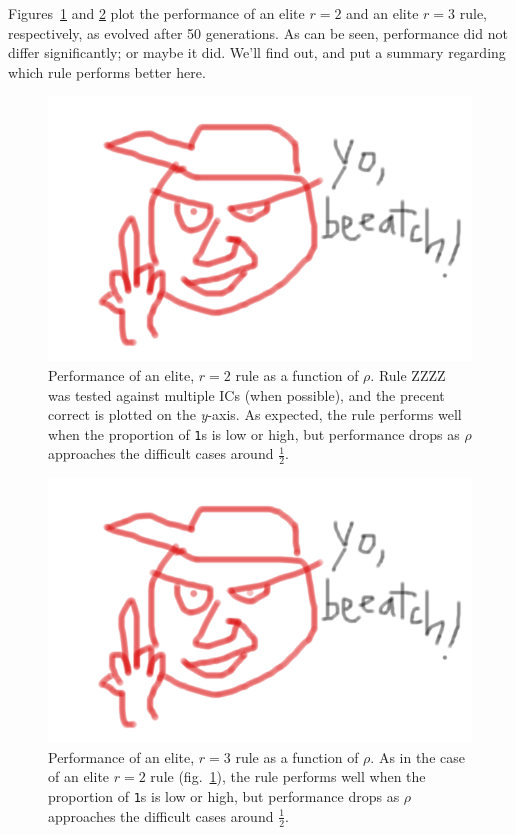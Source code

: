 Figures~\ref{fig:r2_rho} and \ref{fig:r3_rho} plot the performance of an elite $r = 2$ and an elite $r = 3$ rule, respectively, as evolved after 50 generations. As can be seen, performance did not differ significantly; or maybe it did. We'll find out, and put a summary regarding which rule performs better here.

\begin{figure}
\begin{center}
\includegraphics[width=\linewidth]{foo.png}
\caption{Performance of an elite, $r = 2$ rule as a function of $\rho$. Rule ZZZZ was tested against multiple ICs (when possible), and the precent correct is plotted on the \textit{y}-axis. As expected, the rule performs well when the proportion of \texttt{1}s is 
low or high, but performance drops as $\rho$ approaches the difficult cases around $\frac{1}{2}$.}
\label{fig:r2_rho}
\end{center}
\end{figure}
\begin{figure} [ht]
\begin{center}
\includegraphics[width=\linewidth]{foo.png}
\caption{Performance of an elite, $r = 3$ rule as a function of $\rho$. As in the case of an elite $r = 2$ rule (fig.~\ref{fig:r2_rho}), the rule performs well when the proportion of \texttt{1}s is 
low or high, but performance drops as $\rho$ approaches the difficult cases around $\frac{1}{2}$.}
\label{fig:r3_rho}
\end{center}
\end{figure}

